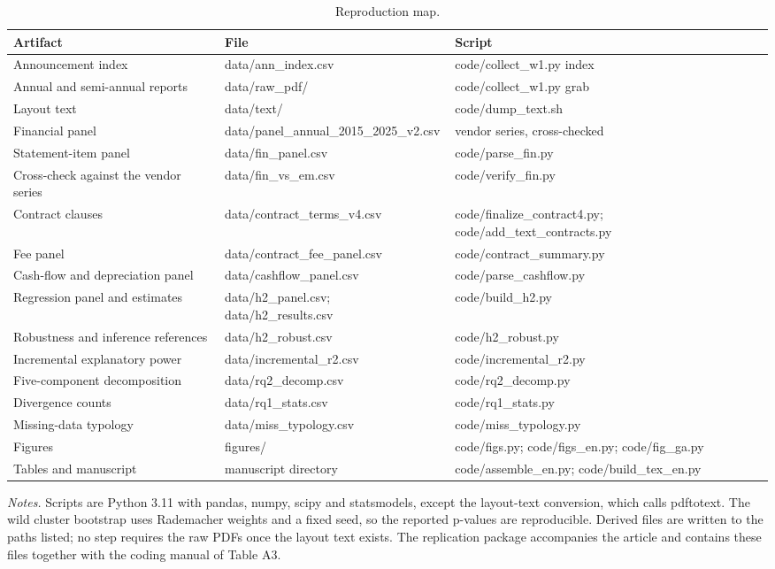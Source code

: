 \documentclass[review,3p,times]{elsarticle}
\begin{document}
\begin{table}[!htbp]
\centering
\renewcommand{\thetable}{A9}
\caption{Reproduction map.}\label{tab:A9}
\begin{minipage}{\textwidth}
\centering
\footnotesize
\begin{adjustbox}{max width=\textwidth}
\begin{tabular}{@{}lll@{}}
\toprule
Artifact & File & Script \\
\midrule
Announcement index & data/ann\_index.csv & code/collect\_w1.py index \\
Annual and semi-annual reports & data/raw\_pdf/ & code/collect\_w1.py grab \\
Layout text & data/text/ & code/dump\_text.sh \\
Financial panel & data/panel\_annual\_2015\_2025\_v2.csv & vendor series, cross-checked \\
Statement-item panel & data/fin\_panel.csv & code/parse\_fin.py \\
Cross-check against the vendor series & data/fin\_vs\_em.csv & code/verify\_fin.py \\
Contract clauses & data/contract\_terms\_v4.csv & code/finalize\_contract4.py; code/add\_text\_contracts.py \\
Fee panel & data/contract\_fee\_panel.csv & code/contract\_summary.py \\
Cash-flow and depreciation panel & data/cashflow\_panel.csv & code/parse\_cashflow.py \\
Regression panel and estimates & data/h2\_panel.csv; data/h2\_results.csv & code/build\_h2.py \\
Robustness and inference references & data/h2\_robust.csv & code/h2\_robust.py \\
Incremental explanatory power & data/incremental\_r2.csv & code/incremental\_r2.py \\
Five-component decomposition & data/rq2\_decomp.csv & code/rq2\_decomp.py \\
Divergence counts & data/rq1\_stats.csv & code/rq1\_stats.py \\
Missing-data typology & data/miss\_typology.csv & code/miss\_typology.py \\
Figures & figures/ & code/figs.py; code/figs\_en.py; code/fig\_ga.py \\
Tables and manuscript & manuscript directory & code/assemble\_en.py; code/build\_tex\_en.py \\
\bottomrule
\end{tabular}
\end{adjustbox}
\par\medskip
\raggedright
\noindent\textit{Notes.} Scripts are Python 3.11 with pandas, numpy, scipy and statsmodels, except the layout-text conversion, which calls pdftotext. The wild cluster bootstrap uses Rademacher weights and a fixed seed, so the reported p-values are reproducible. Derived files are written to the paths listed; no step requires the raw PDFs once the layout text exists. The replication package accompanies the article and contains these files together with the coding manual of Table A3.
\end{minipage}
\end{table}
\end{document}
